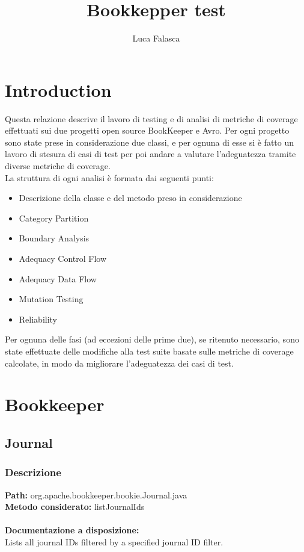 \documentclass[12pt, a4paper]{article}
\title{Bookkepper test}
\author{Luca Falasca}
\begin{document}
\maketitle

\thispagestyle{empty}
\tableofcontents
\listoftables
\listoffigures


\thispagestyle{empty}
\newpage
\setcounter{page}{1}
\section{Introduction}
Questa relazione descrive il lavoro di testing e di analisi di metriche di coverage
 effettuati sui due progetti open source BookKeeper e Avro.
Per ogni progetto sono state prese in considerazione due classi, e per ognuna di esse
si è fatto un lavoro di stesura di casi di test per poi andare a valutare l'adeguatezza
tramite diverse metriche di coverage. \\
La struttura di ogni analisi è formata dai seguenti punti: 
\begin{itemize}
  \item Descrizione della classe e del metodo preso in considerazione
  \item Category Partition
  \item Boundary Analysis
  \item Adequacy Control Flow
  \item Adequacy Data Flow
  \item Mutation Testing
  \item Reliability
\end{itemize} 
Per ognuna delle fasi (ad eccezioni delle prime due), se ritenuto necessario, sono state effettuate delle modifiche
alla test suite basate sulle metriche di coverage calcolate, in modo da migliorare l'adeguatezza dei casi di test.
\section{Bookkeeper}
\subsection{Journal}

\subsubsection{Descrizione}
\textbf{Path:} org.apache.bookkeeper.bookie.Journal.java \\
\textbf{Metodo considerato:} listJournalIds \\ \\
\textbf{Documentazione a disposizione:} \\
Lists all journal IDs filtered by a specified journal ID filter.
\end{document}
